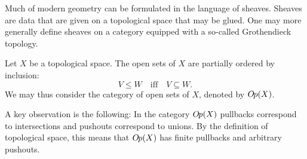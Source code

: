 Much of modern geometry can be formulated in the language of sheaves. Sheaves are data that are given on a topological space that may be glued. One may more generally define sheaves on a category equipped with a so-called Grothendieck topology.

\begin{construction}\label{def:opens}
  Let $X$ be a topological space. The open sets of $X$ are partially ordered by inclusion: \[V \le W \quad \text{iff} \quad V \subseteq W.\]
  We may thus consider the category of open sets of $X$, denoted by $O\kern-0.10em p(X)$.
\end{construction}
A key observation is the following: In the category $O\kern-0.10em p(X)$ pullbacks correspond to intersections and pushouts correspond to unions. By the definition of topological space, this means that $O\kern-0.10em p(X)$ has finite pullbacks and arbitrary pushouts.

